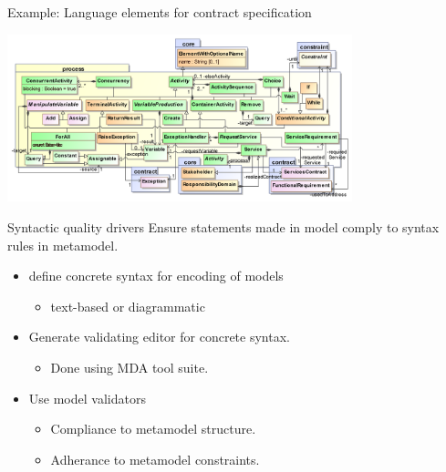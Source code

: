 
\begin{frame}{Example: Language elements for contract specification}

  \includegraphics[width=100mm]{process}

\end{frame}


\begin{frame}{Syntactic quality drivers}
  Ensure statements made in model comply to syntax rules in metamodel.
  \pause
  \begin{itemize} 
    \item<+-| alert@+> define concrete syntax for encoding of models 
      \begin{itemize}
	\item text-based or diagrammatic
      \end{itemize}
    \item<+-| alert@+> Generate validating editor for concrete syntax.
      \begin{itemize}
	\item Done using MDA tool suite.
      \end{itemize}
    \item<+-| alert@+> Use model validators
      \begin{itemize}
	\item Compliance to metamodel structure.
	\item Adherance to metamodel constraints.
      \end{itemize}
  \end{itemize}
\end{frame}


